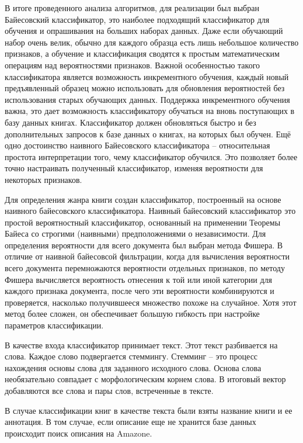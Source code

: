 \documentclass[a4paper, 12pt]{report}
\begin{document}
В итоге проведенного анализа алгоритмов, для реализации был выбран Байесовский классификатор, \tk это наиболее подходящий классификатор для обучения и опрашивания на больших наборах данных. Даже если обучающий набор очень велик, обычно для каждого образца есть лишь небольшое количество признаков, а обучение и классификация сводятся к простым математическим операциям над вероятностями признаков. Важной особенностью такого классификатора является возможность инкрементного обучения, \te каждый новый предъявленный образец можно использовать для обновления вероятностей без использования старых обучающих данных. Поддержка инкрементного обучения важна, \tk это дает возможность классификатору обучаться на вновь поступающих в базу данных книгах. Классификатор должен обновляться быстро и без дополнительных запросов к базе данных о книгах, на которых был обучен. Ещё одно достоинство наивного Байесовского классификатора -- относительная простота интерпретации того, чему классификатор обучился. Это позволяет более точно настраивать полученный классификатор, изменяя вероятности для некоторых признаков.


 Для определения жанра книги создан классификатор, построенный на основе наивного байесовского классификатора. Наивный байесовский классификатор это простой вероятностный классификатор, основанный на применении Теоремы Байеса со строгими (наивными) предположениями о независимости. Для определения вероятности для всего документа был выбран метода Фишера. 
В отличие от наивной байесовсой фильтрации, когда для вычисления вероятности всего документа перемножаются вероятности отдельных признаков, по методу Фишера вычисляется вероятность отнесения к той или иной категории для каждого признака документа, после чего эти вероятности комбинируются и проверяется, насколько получившееся множество похоже на случайное. Хотя этот метод более сложен, он обеспечивает большую гибкость при настройке параметров классификации.

В качестве входа классификатор принимает текст. Этот текст разбивается на слова. Каждое слово подвергается стеммингу. Стемминг -- это процесс нахождения основы слова для заданного исходного слова. Основа слова необязательно совпадает с морфологическим корнем слова. В итоговый вектор добавляются все слова и пары слов, встреченные в тексте.

В случае классификации книг в качестве текста были взяты название книги и ее аннотация. В том случае, если описание  еще не хранится базе данных происходит поиск описания на Amazone.
\end{document}
